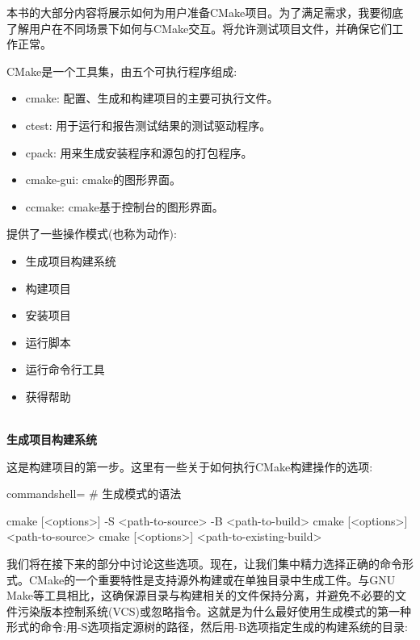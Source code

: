 
本书的大部分内容将展示如何为用户准备CMake项目。为了满足需求，我要彻底了解用户在不同场景下如何与CMake交互。将允许测试项目文件，并确保它们工作正常。

CMake是一个工具集，由五个可执行程序组成:

\begin{itemize}
\item 
cmake: 配置、生成和构建项目的主要可执行文件。

\item 
ctest: 用于运行和报告测试结果的测试驱动程序。

\item 
cpack: 用来生成安装程序和源包的打包程序。

\item 
cmake-gui: cmake的图形界面。

\item 
ccmake: cmake基于控制台的图形界面。
\end{itemize}


提供了一些操作模式(也称为动作):

\begin{itemize}
\item 
生成项目构建系统

\item 
构建项目

\item 
安装项目

\item 
运行脚本

\item 
运行命令行工具

\item 
获得帮助
\end{itemize}

\hspace*{\fill} \\ %
\noindent
\textbf{生成项目构建系统}

这是构建项目的第一步。这里有一些关于如何执行CMake构建操作的选项:

\begin{tcblisting}{commandshell={}}
# 生成模式的语法

cmake [<options>] -S <path-to-source> -B <path-to-build>
cmake [<options>] <path-to-source>
cmake [<options>] <path-to-existing-build>
\end{tcblisting}

我们将在接下来的部分中讨论这些选项。现在，让我们集中精力选择正确的命令形式。CMake的一个重要特性是支持源外构建或在单独目录中生成工件。与GNU Make等工具相比，这确保源目录与构建相关的文件保持分离，并避免不必要的文件污染版本控制系统(VCS)或忽略指令。这就是为什么最好使用生成模式的第一种形式的命令:用-S选项指定源树的路径，然后用-B选项指定生成的构建系统的目录:

